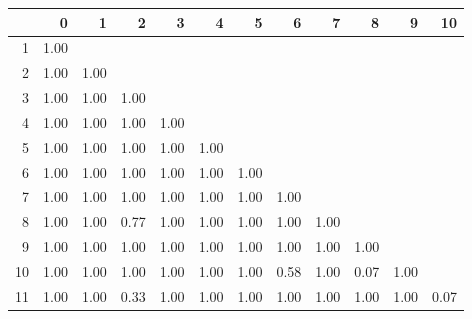 \begin{tabular}{rrrrrrrrrrrr}
  \hline
 & 0 & 1 & 2 & 3 & 4 & 5 & 6 & 7 & 8 & 9 & 10 \\ 
  \hline
1 & 1.00 &  &  &  &  &  &  &  &  &  &  \\ 
  2 & 1.00 & 1.00 &  &  &  &  &  &  &  &  &  \\ 
  3 & 1.00 & 1.00 & 1.00 &  &  &  &  &  &  &  &  \\ 
  4 & 1.00 & 1.00 & 1.00 & 1.00 &  &  &  &  &  &  &  \\ 
  5 & 1.00 & 1.00 & 1.00 & 1.00 & 1.00 &  &  &  &  &  &  \\ 
  6 & 1.00 & 1.00 & 1.00 & 1.00 & 1.00 & 1.00 &  &  &  &  &  \\ 
  7 & 1.00 & 1.00 & 1.00 & 1.00 & 1.00 & 1.00 & 1.00 &  &  &  &  \\ 
  8 & 1.00 & 1.00 & 0.77 & 1.00 & 1.00 & 1.00 & 1.00 & 1.00 &  &  &  \\ 
  9 & 1.00 & 1.00 & 1.00 & 1.00 & 1.00 & 1.00 & 1.00 & 1.00 & 1.00 &  &  \\ 
  10 & 1.00 & 1.00 & 1.00 & 1.00 & 1.00 & 1.00 & 0.58 & 1.00 & 0.07 & 1.00 &  \\ 
  11 & 1.00 & 1.00 & 0.33 & 1.00 & 1.00 & 1.00 & 1.00 & 1.00 & 1.00 & 1.00 & 0.07 \\ 
   \hline
\end{tabular}
